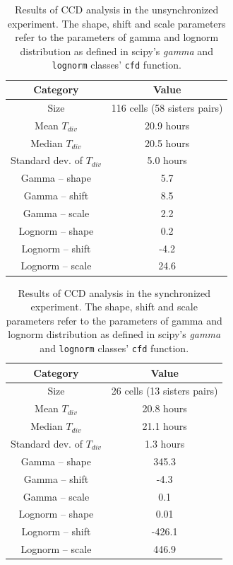 \documentclass[pdftex,12pt,a4paper]{report}
\begin{document}
\begin{table}[H]
\centering
\begin{tabular}{ c | c }
Category & Value \\
\hline\hline
Size & 116 cells (58 sisters pairs) \\
Mean $T_{div}$ & 20.9 hours \\
Median $T_{div}$ & 20.5 hours \\
Standard dev. of $T_{div}$ & 5.0 hours \\
\hline
Gamma -- shape & 5.7 \\
Gamma -- shift & 8.5 \\
Gamma -- scale & 2.2 \\
\hline Lognorm -- shape & 0.2 \\
Lognorm --  shift & -4.2 \\
Lognorm --  scale & 24.6 \\
\hline
\end{tabular}
\caption[Results of CCD analysis in the unsynchronized experiment]{Results of CCD analysis in the unsynchronized experiment. The shape, shift and scale parameters refer to the parameters of gamma and lognorm  distribution as defined in scipy's \textit{gamma} and \texttt{lognorm} classes' \texttt{cfd} function.}
\label{table:ccd_res_unsyn}
\end{table}

\begin{table}[H]
\centering
\begin{tabular}{ c | c }
Category & Value \\
\hline\hline
Size & 26 cells (13 sisters pairs) \\
Mean $T_{div}$ & 20.8 hours \\
Median $T_{div}$ & 21.1 hours \\
Standard dev. of $T_{div}$ & 1.3 hours \\
\hline
Gamma -- shape & 345.3 \\
Gamma -- shift & -4.3 \\
Gamma -- scale & 0.1 \\
\hline Lognorm -- shape & 0.01 \\
Lognorm --  shift & -426.1 \\
Lognorm --  scale & 446.9 \\
\hline
\end{tabular}
\caption[Results of CCD analysis in the synchronized experiment]{Results of CCD analysis in the synchronized experiment. The shape, shift and scale parameters refer to the parameters of gamma and lognorm  distribution as defined in scipy's \textit{gamma} and \texttt{lognorm} classes' \texttt{cfd} function.}
\label{table:ccd_res_syn}
\end{table}
\end{document}
